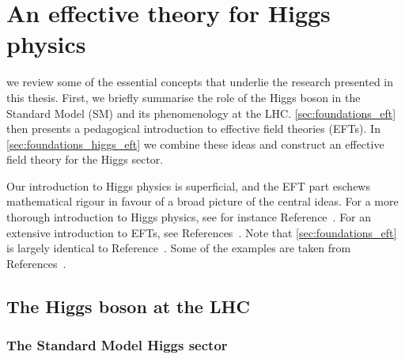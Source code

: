 




\chapter{An effective theory for Higgs physics}
\label{chapter:foundations}

 we review some of the essential concepts
that underlie the research presented in this thesis. First, we briefly
summarise the role of the Higgs boson in the Standard Model (SM) and
its phenomenology at the LHC.  \autoref{sec:foundations_eft} then
presents a pedagogical introduction to effective field theories
(EFTs). In \autoref{sec:foundations_higgs_eft} we combine these ideas
and construct an effective field theory for the Higgs sector.

Our introduction to Higgs physics is superficial, and the EFT part
eschews mathematical rigour in favour of a broad picture of the
central ideas. For a more thorough introduction to Higgs physics, see
for instance Reference~\cite{Plehn:2009nd}. For an extensive
introduction to EFTs, see References~\cite{Georgi:1994qn,
  Kaplan:2005es}. Note that \autoref{sec:foundations_eft} is largely
identical to Reference~\cite{Brehmer:EFTlecture}. Some of the examples
are taken from References~\cite{Georgi:1994qn, Kaplan:2005es}.



\section{The Higgs boson at the LHC}
\label{sec:foundations_Higgs}


\subsection{The Standard Model Higgs sector}

